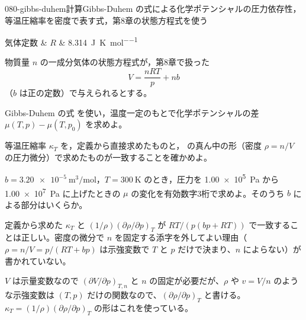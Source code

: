 \documentclass[uplatex,dvipdfmx,a4paper,11pt]{jsarticle}
\begin{document}
\begin{mondai}{080-gibbs-duhem}{計算}{Gibbs-Duhem の式による化学ポテンシャルの圧力依存性，等温圧縮率を密度で表す式，第8章の状態方程式を使う}
\begin{teisuu}
  気体定数 & $R$ & \qty{8.314}{\joule\per\kelvin\per\mole}\\
\end{teisuu}
物質量 $n$ の一成分気体の状態方程式が，第8章で扱った
  \[ V = \frac{nRT}{p} + nb \]
  （$b$ は正の定数）で与えられるとする。
  \begin{shoumon}
    \item Gibbs-Duhem の式  を使い，温度一定のもとで化学ポテンシャルの差 $\mu(T,p) - \mu(T,p_{0})$ を求めよ。
    \item 等温圧縮率 $\kappa_{T}$ を，定義から直接求めたものと， の真ん中の形（密度 $\rho = n/V$ の圧力微分）で求めたものが一致することを確かめよ。
    \item $b = \qty{3.20e-5}{\metre\cubed\per\mole}$，$T = \qty{300}{\kelvin}$ のとき，圧力を \qty{1.00e5}{\pascal} から \qty{1.00e7}{\pascal} に上げたときの $\mu$ の変化を有効数字3桁で求めよ。そのうち $b$ による部分はいくらか。
  \end{shoumon}

\begin{kotaeran}
   定義から求めた $\kappa_{T}$ と $(1/\rho)(\partial\rho/\partial p)_{T}$ が $RT/(p(bp+RT))$ で一致することは正しい。密度の微分で $n$ を固定する添字を外してよい理由（$\rho=n/V=p/(RT+bp)$ は示強変数で $T$ と $p$ だけで決まり、$n$ によらない）が書かれていない。
\end{kotaeran}
\begin{rikai}
  \item $V$ は示量変数なので $(\partial V/\partial p)_{T,n}$ と $n$ の固定が必要だが、$\rho$ や $v=V/n$ のような示強変数は $(T,p)$ だけの関数なので、$(\partial\rho/\partial p)_{T}$ と書ける。$\kappa_{T}=(1/\rho)(\partial\rho/\partial p)_{T}$ の形はこれを使っている。
\end{rikai}
\end{mondai}
\end{document}
